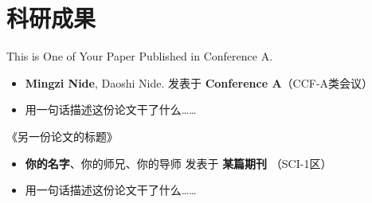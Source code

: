 \documentclass[11pt]{article}
\newlength{\iconwidth}
\begin{document}
    \hfill
    \begin{minipage}[t]{0.2\textwidth}
        \vspace{2em}
        \setlength{\fboxsep}{0pt}
    \end{minipage}

    \begin{minipage}[t]{\textwidth}
    \section[科研成果]{\makebox[\iconwidth][c]{\color{primary_color}{\faAtom}}\quad 科研成果}

    This is One of Your Paper Published in Conference A.
    \begin{itemize}
        \item \textbf{Mingzi Nide}, Daoshi Nide. \hfill 发表于 \textbf{Conference A}（CCF-A类会议）
        \item 用一句话描述这份论文干了什么\dots\dots
    \end{itemize}

    \vspace{0.5em}
    《另一份论文的标题》
    \begin{itemize}
        \item  \textbf{你的名字}、你的师兄、你的导师 \hfill 发表于 \textbf{某篇期刊} （SCI-1区）
        \item 用一句话描述这份论文干了什么\dots\dots
    \end{itemize}

    \vspace{1.2em}
    \end{minipage}
\end{document}
